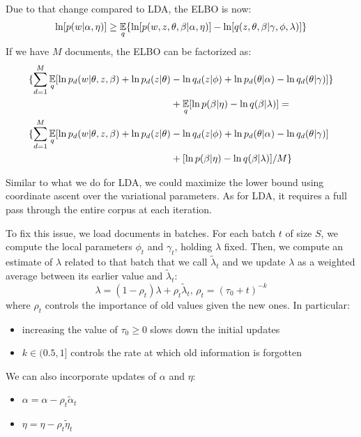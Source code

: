 Due to that change compared to LDA, the ELBO is now:
\begin{equation*}
    \ln [p(w | \alpha, \eta)] \geq \operatorname*{\mathbb{E}}_q\{ \ln [p(w, z, \theta, \beta | \alpha, \eta)] - \ln[q(z, \theta, \beta | \gamma, \phi, \lambda)] \}
\end{equation*}
If we have $M$ documents, the ELBO can be factorized as:
\begin{equation*}
    \begin{split}
        \{\sum_{d=1}^M \operatorname*{\mathbb{E}}_{q} [ \ln p_d(w | \theta, z, \beta) + \ln p_d(z | \theta) & - \ln q_d(z | \phi) + \ln p_d(\theta | \alpha) - \ln q_d(\theta | \gamma)]\} \\
        & + \operatorname*{\mathbb{E}}_q[\ln p(\beta | \eta) - \ln q(\beta | \lambda)] = \\
        \{\sum_{d=1}^M \operatorname*{\mathbb{E}}_{q} [ \ln p_d(w | \theta, z, \beta) + \ln p_d(z | \theta) & - \ln q_d(z | \phi) + \ln p_d(\theta | \alpha) - \ln q_d(\theta | \gamma)] \\
        & + [\ln p(\beta | \eta) - \ln q(\beta | \lambda)]/M \} \\
    \end{split}
\end{equation*}

Similar to what we do for LDA, we could maximize the lower bound using coordinate ascent over the variational parameters.
As for LDA, it requires a full pass through the entire corpus at each iteration.

To fix this issue, we load documents in batches. For each batch $t$ of size $S$, we compute the local parameters $\phi_t$ and $\gamma_t$, holding $\lambda$ fixed.
Then, we compute an estimate of $\lambda$ related to that batch that we call $\tilde{\lambda}_t$
and we update $\lambda$ as a weighted average between its earlier value and $\tilde{\lambda}_t$:
\begin{equation*}
    \lambda = (1 - \rho_t) \lambda + \rho_t \tilde{\lambda}_t, \, \rho_t = (\tau_0 + t)^{-k}
\end{equation*}
where $\rho_t$ controls the importance of old values given the new ones. In particular:
\begin{itemize}
    \item increasing the value of $\tau_0 \geq 0$ slows down the initial updates
    \item $k \in (0.5, 1]$ controls the rate at which old information is forgotten
\end{itemize}

We can also incorporate updates of $\alpha$ and $\eta$:
\begin{itemize}
    \item $\alpha = \alpha - \rho_t \tilde{\alpha}_t$
    \item $\eta = \eta - \rho_t \tilde{\eta}_t$
\end{itemize}

